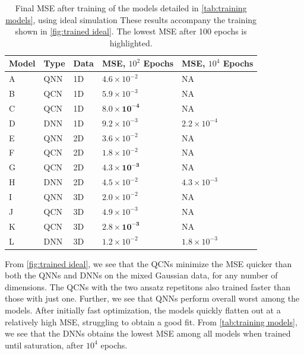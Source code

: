 \begin{table}[H]
\centering
\caption{Final MSE after training of the models detailed in \autoref{tab:training models}, using ideal simulation These results accompany the training shown in \autoref{fig:trained ideal}. The lowest MSE after 100 epochs is highlighted.}
\begin{tabular}{|l|l|l|l|l|}
\hline
Model& Type& Data& MSE, $10^{2}$ Epochs& MSE, $10^{4}$ Epochs \\ \hline
A    & QNN & 1D  &  $4.6\times 10^{-2}$  & NA   \\ \hline
B    & QCN & 1D  & $5.9\times 10^{-3}$  & NA \\ \hline
C    & QCN & 1D  & $\boldsymbol{8.0\times 10^{-4}}$  & NA  \\ \hline
D    & DNN & 1D  & $9.2\times 10^{-3}$ & $2.2\times 10^{-4}$  \\ \Xhline{2\arrayrulewidth}
E    & QNN & 2D  &  $3.6\times 10^{-2}$ & NA  \\ \hline
F    & QCN & 2D  &  $1.8\times 10^{-2}$ & NA  \\ \hline
G    & QCN & 2D  &  $\boldsymbol{4.3\times 10^{-3}}$ & NA  \\ \hline
H    & DNN & 2D  &  $4.5\times10^{-2}$ & $4.3\times10^{-3}$\\ 
\Xhline{2\arrayrulewidth}
I    & QNN & 3D  &  $2.0\times 10^{-2}$& NA  \\ \hline
J    & QCN & 3D  &  $4.9\times 10^{-3}$ & NA  \\ \hline
K    & QCN & 3D  &  $\boldsymbol{2.8\times10^{-3}}$  & NA  \\ \hline
L    & DNN & 3D  &  $1.2\times10^{-2}$  & $1.8\times10^{-3}$  \\ \hline
\end{tabular}
 
\label{tab:training models mse}
\end{table}

From \autoref{fig:trained ideal}, we see that the QCNs minimize the MSE quicker than both the QNNs and DNNs on the mixed Gaussian data, for any number of dimensions. The QCNs with the two ansatz repetitons also trained faster than those with just one. Further, we see that QNNs perform overall worst among the models. After initially fast optimization, the models quickly flatten out at a relatively high MSE, struggling to obtain a good fit. From \autoref{tab:training models}, we see that the DNNs obtains the lowest MSE among all models when trained until saturation, after $10^4$ epochs.


